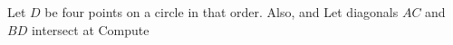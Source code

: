 Let    $D$ be four points on a circle in that order. Also,    and  Let diagonals $AC$ and $BD$ intersect at  Compute 